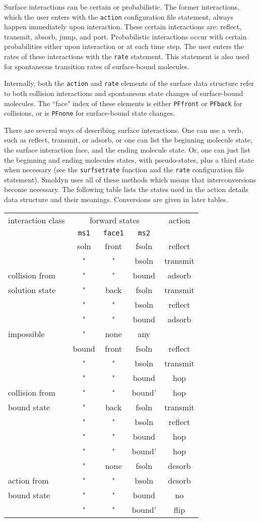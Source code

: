 \documentclass {book}
\begin{document}
Surface interactions can be certain or probabilistic.  The former interactions, which the user enters with the \texttt{action} configuration file statement, always happen immediately upon interaction.  These certain interactions are: reflect, transmit, absorb, jump, and port.  Probabilistic interactions occur with certain probabilities either upon interaction or at each time step.  The user enters the rates of these interactions with the \texttt{rate} statement.  This statement is also used for spontaneous transition rates of surface-bound molecules.

Internally, both the \texttt{action} and \texttt{rate} elements of the surface data structure refer to both collision interactions and spontaneous state changes of surface-bound molecules.  The ``face" index of these elements is either \texttt{PFfront} or \texttt{PFback} for collisions, or is \texttt{PFnone} for surface-bound state changes.

There are several ways of describing surface interactions.  One can use a verb, such as reflect, transmit, or adsorb, or one can list the beginning molecule state, the surface interaction face, and the ending molecule state.  Or, one can just list the beginning and ending molecules states, with pseudo-states, plus a third state when necessary (see the \texttt{surfsetrate} function and the \texttt{rate} configuration file statement).  Smoldyn uses all of these methods which means that interconversions become necessary.  The following table lists the states used in the action details data structure and their meanings.  Conversions are given in later tables.

\begin{longtable}[c]{l|ccc|c}
interaction class&\multicolumn{3}{c}{forward states}&action\\
&\texttt{ms1}&\texttt{face1}&\texttt{ms2}\\
\hline
&soln&front&fsoln&reflect\\
&"&"&bsoln&transmit\\
collision from&"&"&bound&adsorb\\
solution state&"&back&fsoln&transmit\\
&"&"&bsoln&reflect\\
&"&"&bound&adsorb\\
\hline
impossible&"&none&any\\
\hline
&bound&front&fsoln&reflect\\
&"&"&bsoln&transmit\\
&"&"&bound&hop\\
collision from&"&"&bound'&hop\\
bound state&"&back&fsoln&transmit\\
&"&"&bsoln&reflect\\
&"&"&bound&hop\\
&"&"&bound'&hop\\
\hline
&"&none&fsoln&desorb\\
action from&"&"&bsoln&desorb\\
bound state&"&"&bound&no\\
&"&"&bound'&flip\\
\end{longtable}
\end{document}
